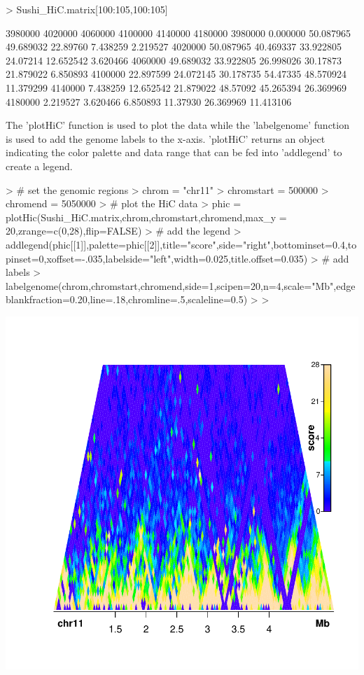\documentclass{article}
\begin{document}
\begin{Schunk}
\begin{Sinput}
> Sushi_HiC.matrix[100:105,100:105]
\end{Sinput}
\begin{Soutput}
          3980000   4020000   4060000  4100000   4140000   4180000
3980000  0.000000 50.087965 49.689032 22.89760  7.438259  2.219527
4020000 50.087965 40.469337 33.922805 24.07214 12.652542  3.620466
4060000 49.689032 33.922805 26.998026 30.17873 21.879022  6.850893
4100000 22.897599 24.072145 30.178735 54.47335 48.570924 11.379299
4140000  7.438259 12.652542 21.879022 48.57092 45.265394 26.369969
4180000  2.219527  3.620466  6.850893 11.37930 26.369969 11.413106
\end{Soutput}
\end{Schunk}

The 'plotHiC' function is used to plot the data while the 'labelgenome' function is used to add the genome labels to the x-axis.  'plotHiC' returns an object indicating the color palette and data range that can be fed into 'addlegend' to create a legend.

\begin{center}

\begin{Schunk}
\begin{Sinput}
> # set the genomic regions
> chrom            = "chr11"
> chromstart       = 500000
> chromend         = 5050000
> # plot the HiC data
> phic = plotHic(Sushi_HiC.matrix,chrom,chromstart,chromend,max_y = 20,zrange=c(0,28),flip=FALSE)
> # add the legend
> addlegend(phic[[1]],palette=phic[[2]],title="score",side="right",bottominset=0.4,topinset=0,xoffset=-.035,labelside="left",width=0.025,title.offset=0.035)
> # add labels
> labelgenome(chrom,chromstart,chromend,side=1,scipen=20,n=4,scale="Mb",edgeblankfraction=0.20,line=.18,chromline=.5,scaleline=0.5)
> 
> 
\end{Sinput}
\end{Schunk}
\includegraphics{Sushi-005}
\end{center}
\end{document}

